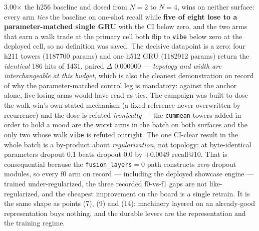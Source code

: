 \documentclass[11pt]{article}
\begin{document}
\num{3.00}$\times$ the h256 baseline and dosed from $N=2$ to $N=4$, wins on
neither surface: every arm \emph{ties} the baseline on one-shot recall while
\textbf{five of eight lose to a parameter-matched single GRU} with the CI below
zero, and the two arms that earn a walk trade at the primary cell both flip to
\texttt{vibe} below zero at the deployed cell, so no definition was saved. The
decisive datapoint is a zero: four h211 towers (\num{1187700} params) and one
h512 GRU (\num{1182912} params) return the \emph{identical} \num{186} hits of
\num{1431}, paired $\Delta$ \num{0.000000} --- \emph{topology and width are
interchangeable at this budget}, which is also the cleanest demonstration on
record of why the parameter-matched control leg is mandatory: against the anchor
alone, five losing arms would have read as ties. The campaign was built to dose
the walk win's own stated mechanism (a fixed reference never overwritten by
recurrence) and the dose is refuted \emph{ironically} --- the \texttt{cummean}
towers added in order to hold a mood are the worst arms in the batch on both
surfaces and the only two whose walk \texttt{vibe} is refuted outright. The one
CI-clear result in the whole batch is a by-product about \emph{regularization},
not topology: at byte-identical parameters dropout \num{0.1} beats dropout
\num{0.0} by $+\num{0.0049}$ recall@10. That is consequential because the
\texttt{fusion\_layers}${}=0$ path constructs \emph{zero} dropout modules, so
every f0 arm on record --- including the deployed showcase engine --- trained
under-regularized, the three recorded f0-vs-f1 gaps are not like-regularized, and
the cheapest improvement on the board is a single retrain. It is the same shape as
points (7), (9) and (14): machinery layered on an already-good representation
buys nothing, and the durable levers are the representation and the training
regime.
\end{document}
